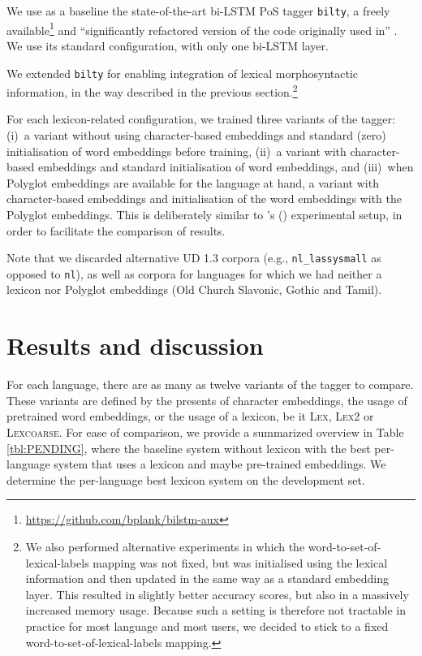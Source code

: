 \documentclass[11pt,letterpaper]{article}
\begin{document}
We use as a baseline the state-of-the-art bi-LSTM PoS tagger \texttt{bilty}, a freely
available\footnote{\url{https://github.com/bplank/bilstm-aux}} and ``significantly refactored version of the code
originally used in'' \cite{plank16}. We use its standard configuration, with only one bi-LSTM layer.

We extended \texttt{bilty} for enabling integration of lexical morphosyntactic information, in the way described in the
previous section.\footnote{We also performed alternative experiments in which the word-to-set-of-lexical-labels mapping
  was not fixed, but was initialised using the lexical information and then updated in the same way as a standard
  embedding layer. This resulted in slightly better accuracy scores, but also in a massively increased memory
  usage. Because such a setting is therefore not tractable in practice for most language and most users, we decided to
  stick to a fixed word-to-set-of-lexical-labels mapping.}

For each lexicon-related configuration, we trained three variants of the tagger: (i)~a variant without using
character-based embeddings and standard (zero) initialisation of word embeddings before training, (ii)~a variant with
character-based embeddings and standard initialisation of word embeddings, and (iii)~when Polyglot embeddings are
available for the language at hand, a variant with character-based embeddings and initialisation of the word embeddings
with the Polyglot embeddings. This is deliberately similar to \citeauthor{plank16}'s (\citeyear{plank16}) experimental
setup, in order to facilitate the comparison of results.

Note that we discarded alternative UD 1.3 corpora (e.g., {\tt nl\_lassysmall} as opposed to {\tt nl}), as well as
corpora for languages for which we had neither a lexicon nor Polyglot embeddings (Old Church Slavonic, Gothic and Tamil).


\section{Results and discussion}

For each language, there are as many as twelve variants of the tagger to compare. These variants are defined by the presents of character embeddings, the usage of pretrained word embeddings, or the usage of a lexicon, be it \textsc{Lex}, \textsc{Lex2} or \textsc{Lexcoarse}. For ease of comparison, we provide a summarized overview in Table \ref{tbl:PENDING}, where the baseline system without lexicon with the best per-language system that uses a lexicon and maybe pre-trained embeddings. We determine the per-language best lexicon system on the development set.
\end{document}
